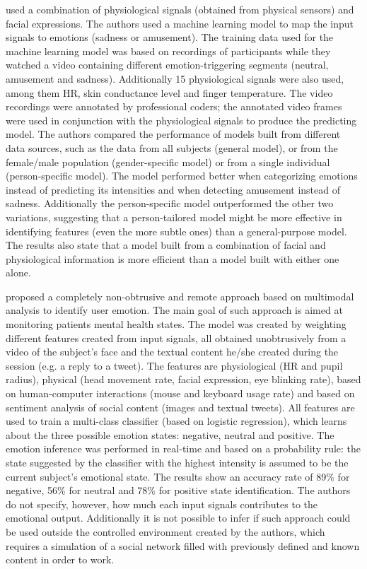 \textcite{bailenson2008real} used a combination of physiological signals (obtained from physical sensors) and facial expressions. The authors used a machine learning model to map the input signals to emotions (sadness or amusement). The training data used for the machine learning model was based on recordings of participants while they watched a video containing different emotion-triggering segments (neutral, amusement and sadness). Additionally 15 physiological signals were also used, among them HR, skin conductance level and finger temperature. The video recordings were annotated by professional coders; the annotated video frames were used in conjunction with the physiological signals to produce the predicting model. The authors compared the performance of models built from different data sources, such as the data from all subjects (general model), or from the female/male population (gender-specific model) or from a single individual (person-specific model). The model performed better when categorizing emotions instead of predicting its intensities and when detecting amusement instead of sadness. Additionally the person-specific model outperformed the other two variations, suggesting that a person-tailored model might be more effective in identifying features (even the more subtle ones) than a general-purpose model. The results also state that a model built from a combination of facial and physiological information is more efficient than a model built with either one alone.

\textcite{mental} proposed a completely non-obtrusive and remote approach based on multimodal analysis to identify user emotion. The main goal of such approach is aimed at monitoring patients mental health states. The model was created by weighting different features created from input signals, all obtained unobtrusively from a video of the subject's face and the textual content he/she created during the session (e.g. a reply to a tweet). The features are physiological (HR and pupil radius), physical (head movement rate, facial expression, eye blinking rate), based on human-computer interactions (mouse and keyboard usage rate) and based on sentiment analysis of social content (images and textual tweets). All features are used to train a multi-class classifier (based on logistic regression), which learns about the three possible emotion states: negative, neutral and positive. The emotion inference was performed in real-time and based on a probability rule: the state suggested by the classifier with the highest intensity is assumed to be the current subject's emotional state. The results show an accuracy rate of 89\% for negative, 56\% for neutral and 78\% for positive state identification. The authors do not specify, however, how much each input signals contributes to the emotional output. Additionally it is not possible to infer if such approach could be used outside the controlled environment created by the authors, which requires a simulation of a social network filled with previously defined and known content in order to work.


